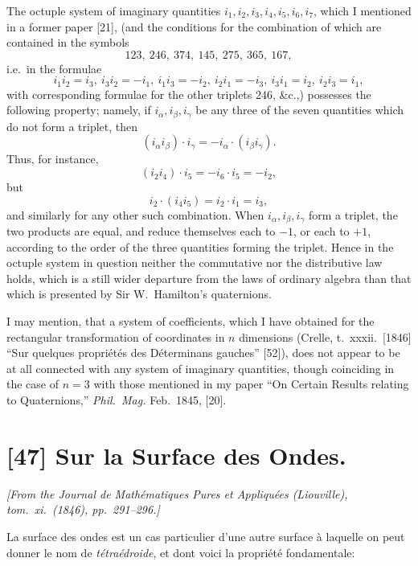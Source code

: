 \documentclass[12pt,a4paper]{article}
\begin{document}
The octuple system of imaginary quantities $i_1, i_2, i_3, i_4, i_5, i_6, i_7$, which I mentioned in a former paper [21], (and the conditions for the combination of which are contained in the symbols
\[
123,\ 246,\ 374,\ 145,\ 275,\ 365,\ 167,
\]
i.e.\ in the formulae
\[
i_1 i_2 = i_3,\ i_3 i_2 = -i_1,\ i_1 i_3 = -i_2,\ i_2 i_1 = -i_3,\ i_3 i_1 = i_2,\ i_2 i_3 = i_1,
\]
with corresponding formulae for the other triplets $246$, \&c.,) possesses the following property; namely, if $i_\alpha, i_\beta, i_\gamma$ be any three of the seven quantities which do not form a triplet, then
\[
(i_\alpha i_\beta)\cdot i_\gamma = -i_\alpha\cdot(i_\beta i_\gamma).
\]
Thus, for instance,
\[
(i_2 i_4)\cdot i_5 = -i_6 \cdot i_5 = -i_2,
\]
but
\[
i_2\cdot(i_4 i_5) = i_2\cdot i_1 = i_3,
\]
and similarly for any other such combination. When $i_\alpha, i_\beta, i_\gamma$ form a triplet, the two products are equal, and reduce themselves each to $-1$, or each to $+1$, according to the order of the three quantities forming the triplet. Hence in the octuple system in question neither the commutative nor the distributive law holds, which is a still wider departure from the laws of ordinary algebra than that which is presented by Sir W.\ Hamilton's quaternions.

I may mention, that a system of coefficients, which I have obtained for the rectangular transformation of coordinates in $n$ dimensions (Crelle, t.~xxxii.~[1846] ``Sur quelques propri\'et\'es des D\'eterminans gauches'' [52]), does not appear to be at all connected with any system of imaginary quantities, though coinciding in the case of $n = 3$ with those mentioned in my paper ``On Certain Results relating to Quaternions,'' \emph{Phil.\ Mag.} Feb.\ 1845, [20].

\newpage

\section*{[47] Sur la Surface des Ondes.}

\textit{[From the Journal de Math\'ematiques Pures et Appliqu\'ees (Liouville), tom.~xi.~(1846), pp.~291--296.]}

\bigskip

La surface des ondes est un cas particulier d'une autre surface \`a laquelle on peut donner le nom de \emph{t\'etra\'edroide}, et dont voici la propri\'et\'e fondamentale:
\end{document}
